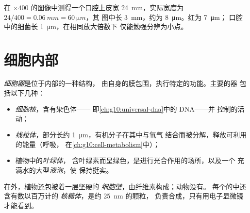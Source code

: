 \begin{example}[口腔上皮细胞]\label{ex:g10:cells-common-unit:cheek}
在 $\times 400$ 的图像中测得一个口腔上皮宽 \qty{24}{mm}，实际宽度为
$24/400 = \qty{0.06}{mm} = \qty{60}{\micro m}$，其
图中长 \qty{3}{mm}，约为 \qty{8}{\micro m}。红为 \qty{7}{\micro m}；
口腔中的细菌长 \qty{1}{\micro m}，在相同放大倍数下
仅能勉强分辨为小点。
\end{example}

\section{细胞内部}

\begin{definition}[细胞器]\label{def:g10:cells-common-unit:organelle}
\emph{细胞器}是位于内部的一种结构，
由自身的膜包围，执行特定的功能。主要的器
包括以下几种：
\begin{itemize}
  \item \emph{细胞核}，含有染色体——
        即\cref{ch:g10:universal-dna}中的 DNA——并
        控制的活动；
  \item \emph{线粒体}，部分长约
        \qty{1}{\micro m}，有机分子在其中与氧气
        结合而被分解，释放可利用的能量（呼吸，
        在\cref{ch:g10:cell-metabolism}中）；
  \item 植物中的\emph{叶绿体}，
        含叶绿素而呈绿色，是进行光合作用的场所，以及一个
        充满水的大型\emph{液泡}，使
        保持挺实。
\end{itemize}
在外，植物还包被着一层坚硬的
\emph{细胞壁}，由纤维素构成；动物没有。
每个的中还含有数以百万计的
\emph{核糖体}，是约 \qty{25}{nm} 的颗粒，
负责合成，只有用电子显微镜才能看到。
\end{definition}

